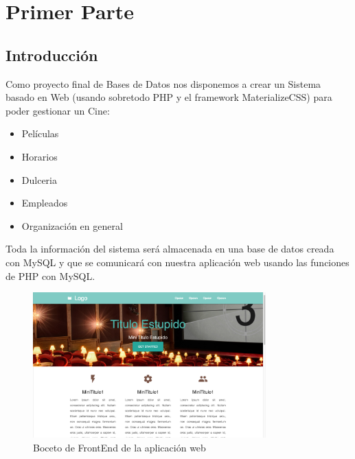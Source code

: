 \documentclass[12pt, fleqn]{report}                             %
\begin{document}
\chapter{Primer Parte}
\clearpage

    \section{Introducción}

        Como proyecto final de Bases de Datos nos disponemos a crear un Sistema basado en Web 
        (usando sobretodo PHP y el framework MaterializeCSS) para poder gestionar un Cine:
        \begin{itemize}
            \item Películas
            \item Horarios
            \item Dulceria
            \item Empleados
            \item Organización en general
        \end{itemize}


        Toda la información del sistema será almacenada en una base de datos creada con MySQL
        y que se comunicará con nuestra aplicación web usando las funciones de PHP con MySQL.

        \clearpage

        \begin{figure}[h!]
            \centering
            \includegraphics[width=0.80\textwidth]{Examples0.png}
            \caption{Boceto de FrontEnd de la aplicación web}
        \end{figure}
\end{document}
